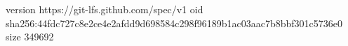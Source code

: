version https://git-lfs.github.com/spec/v1
oid sha256:44fdc727c8e2ce4e2afdd9d698584c298f96189b1ac03aac7b8bbf301c5736e0
size 349692
